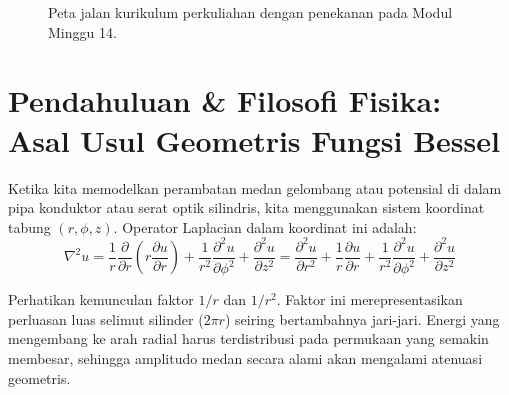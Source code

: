 \documentclass[11pt,a4paper]{article}
\theoremstyle{definition}
\begin{document}
\begin{figure}[htbp]
{%
}
\caption{Peta jalan kurikulum perkuliahan dengan penekanan pada Modul Minggu 14.}
\label{fig:peta_jalan_pd_w14}
\end{figure}

\section{Pendahuluan \& Filosofi Fisika: Asal Usul Geometris Fungsi Bessel}

Ketika kita memodelkan perambatan medan gelombang atau potensial di dalam pipa konduktor atau serat optik silindris, kita menggunakan sistem koordinat tabung $(r, \phi, z)$. Operator Laplacian dalam koordinat ini adalah:
\begin{equation}
    \nabla^2 u = \frac{1}{r} \frac{\partial}{\partial r}\left( r \frac{\partial u}{\partial r} \right) + \frac{1}{r^2} \frac{\partial^2 u}{\partial \phi^2} + \frac{\partial^2 u}{\partial z^2} = \frac{\partial^2 u}{\partial r^2} + \frac{1}{r} \frac{\partial u}{\partial r} + \frac{1}{r^2} \frac{\partial^2 u}{\partial \phi^2} + \frac{\partial^2 u}{\partial z^2}
    \label{eq:laplacian_cylindrical}
\end{equation}

Perhatikan kemunculan faktor $1/r$ dan $1/r^2$. Faktor ini merepresentasikan perluasan luas selimut silinder ($2\pi r$) seiring bertambahnya jari-jari. Energi yang mengembang ke arah radial harus terdistribusi pada permukaan yang semakin membesar, sehingga amplitudo medan secara alami akan mengalami atenuasi geometris.
\end{document}
